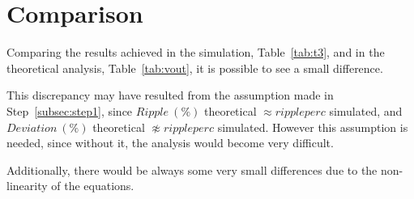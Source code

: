 \clearpage
\section{Comparison}
\label{sec:comparison}

Comparing the results achieved in the simulation, Table~\ref{tab:t3}, and in the theoretical
analysis, Table~\ref{tab:vout}, it is possible to see a small difference.

This discrepancy may have resulted from the assumption made in Step~\ref{subsec:step1},
since $Ripple\ (\%)$ theoretical $\approx rippleperc$ simulated, and
$Deviation\ (\%)$ theoretical $\not\approx rippleperc$ simulated. 
However this assumption is needed, since without it, the analysis would become very difficult.

Additionally, there would be always some very small differences due to the non-linearity of the equations.
